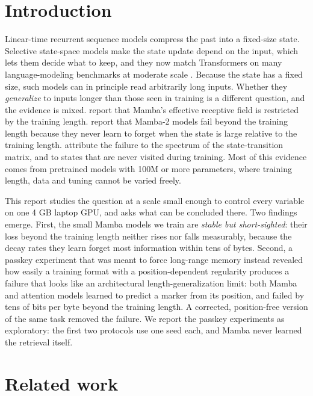 \documentclass[11pt]{article}
\begin{document}
\section{Introduction}\label{sec:intro}

Linear-time recurrent sequence models compress the past into a fixed-size state. Selective state-space models \citep{gu2023mamba,dao2024ssd} make the state update depend on the input, which lets them decide what to keep, and they now match Transformers on many language-modeling benchmarks at moderate scale \citep{waleffe2024empirical}. Because the state has a fixed size, such models can in principle read arbitrarily long inputs. Whether they \emph{generalize} to inputs longer than those seen in training is a different question, and the evidence is mixed. \citet{benkish2025decimamba} report that Mamba's effective receptive field is restricted by the training length. \citet{chen2025stuffed} report that Mamba-2 models fail beyond the training length because they never learn to forget when the state is large relative to the training length. \citet{lu2025modulation} attribute the failure to the spectrum of the state-transition matrix, and \citet{buitrago2025unexplored} to states that are never visited during training. Most of this evidence comes from pretrained models with 100M or more parameters, where training length, data and tuning cannot be varied freely.

This report studies the question at a scale small enough to control every variable on one 4 GB laptop GPU, and asks what can be concluded there. Two findings emerge. First, the small Mamba models we train are \emph{stable but short-sighted}: their loss beyond the training length neither rises nor falls measurably, because the decay rates they learn forget most information within tens of bytes. Second, a passkey experiment that was meant to force long-range memory instead revealed how easily a training format with a position-dependent regularity produces a failure that looks like an architectural length-generalization limit: both Mamba and attention models learned to predict a marker from its position, and failed by tens of bits per byte beyond the training length. A corrected, position-free version of the same task removed the failure. We report the passkey experiments as exploratory: the first two protocols use one seed each, and Mamba never learned the retrieval itself.

\section{Related work}\label{sec:related}
\end{document}
